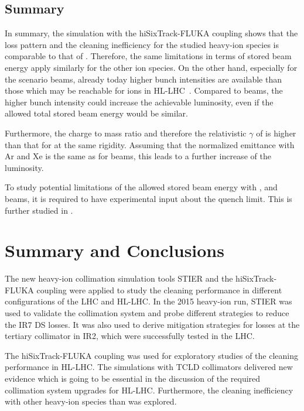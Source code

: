 \subsection{Summary}

In summary, the simulation with the hiSixTrack-FLUKA coupling shows that the loss pattern and the cleaning inefficiency for the studied heavy-ion species is comparable to that of \lead. Therefore, the same limitations in terms of stored beam energy apply similarly for the other ion species. On the other hand, especially for the scenario  beams, already today higher bunch intensities are available than those which may be reachable for \lead ions in \mbox{HL-LHC}~\cite{IPAC16:TUPMR027}. Compared to \lead beams, the higher bunch intensity could increase the achievable luminosity, even if the allowed total stored beam energy would be similar. 

Furthermore, the charge to mass ratio and therefore the relativistic $\gamma$ of  is higher than that for \lead at the same rigidity.  Assuming that the normalized emittance with Ar and Xe is the same as for \lead beams, this leads to a further increase of the luminosity.


To study potential limitations of the allowed stored beam energy with \lead,  and   beams, it is required to have experimental input about the quench limit. This is further studied in .



      
 

\newpage

\section{Summary and Conclusions}


The new heavy-ion collimation simulation tools STIER and the hiSixTrack-FLUKA coupling were applied to study the cleaning performance in different configurations of the LHC and HL-LHC. In the 2015 heavy-ion run, STIER was used to validate the collimation system and probe different strategies to reduce the IR7 DS losses. It was also used to derive mitigation strategies for losses at the tertiary collimator in IR2, which were successfully tested in the LHC. 

The hiSixTrack-FLUKA coupling was used for exploratory studies of the cleaning performance in HL-LHC. The simulations with TCLD collimators delivered new evidence which is going to be essential in the discussion of the required collimation system upgrades for HL-LHC. Furthermore, the cleaning inefficiency with other heavy-ion species than \lead was explored. 



